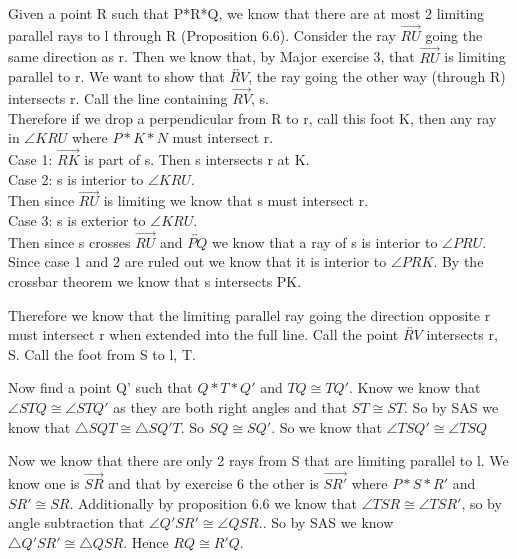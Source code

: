 \documentclass[12pt,letterpaper]{article}
\newcommand{\Proof}{\noindent {\bf Proof: }}
\begin{document}
\Proof

Given a point R such that P*R*Q, we know that there are at most 2 limiting parallel rays to l through R (Proposition 6.6).  Consider the ray $\overrightarrow{RU}$ going the same direction as r.  Then we know that, by Major exercise 3, that $\overrightarrow{RU}$ is limiting parallel to r.  We want to show that $\overleftrightarrow{RV}$, the ray going the other way (through R) intersects r.  Call the line containing $\overrightarrow{RV}$, s.\\

Therefore if we drop a perpendicular from R to r, call this foot K, then any ray in $\angle KRU$ where $P*K*N$ must intersect r. \\

Case 1: $\overrightarrow{RK}$ is part of s.  Then s intersects r at K.\\

Case 2: s is interior to $\angle KRU$.\\

Then since $\overrightarrow{RU}$ is limiting we know that s must intersect r.\\

Case 3: s is exterior to $\angle KRU$.\\

Then since s crosses $\overrightarrow{RU}$ and $\overleftrightarrow{PQ}$ we know that a ray of s is interior to $\angle PRU$.  Since case 1 and 2 are ruled out we know that it is interior to $\angle PRK$.  By the crossbar theorem we know that s intersects PK.

Therefore we know that the limiting parallel ray going the direction opposite r must intersect r when extended into the full line. Call the point $\overleftrightarrow{RV}$ intersects r, S. Call the foot from S to l, T. %



Now find a point Q' such that $Q*T*Q'$ and $TQ \cong TQ'$.  Know we know that $\angle STQ \cong \angle STQ'$ as they are both right angles and that $ST \cong ST$. So by SAS we know that $\triangle SQT \cong \triangle SQ'T$. So $SQ \cong SQ'$. So we know that $\angle TSQ' \cong \angle TSQ$


Now we know that there are only 2 rays from S that are limiting parallel to l. We know one is $\overrightarrow{SR}$ and that by exercise 6 the other is $\overrightarrow{SR'}$ where $P*S*R'$ and $SR' \cong SR$.  Additionally by proposition 6.6 we know that $\angle TSR \cong \angle TSR'$, so by angle subtraction that $\angle Q'SR' \cong \angle QSR$..  So by SAS we know $\triangle Q'SR' \cong \triangle QSR$.  Hence $RQ \cong R'Q$.
\end{document}
